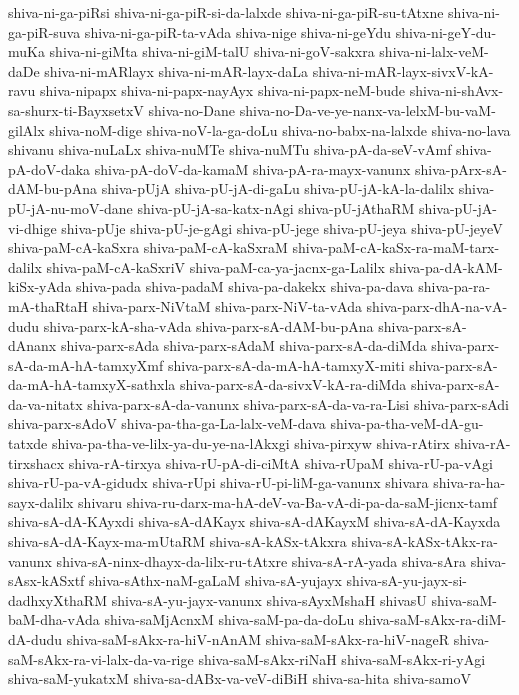 {shiva-ni-ga-piRsi
shiva-ni-ga-piR-si-da-lalxde
shiva-ni-ga-piR-su-tAtxne
shiva-ni-ga-piR-suva
shiva-ni-ga-piR-ta-vAda
shiva-nige
shiva-ni-geYdu
shiva-ni-geY-du-muKa
shiva-ni-giMta
shiva-ni-giM-talU
shiva-ni-goV-sakxra
shiva-ni-lalx-veM-daDe
shiva-ni-mARlayx
shiva-ni-mAR-layx-daLa
shiva-ni-mAR-layx-sivxV-kA-ravu
shiva-nipapx
shiva-ni-papx-nayAyx
shiva-ni-papx-neM-bude
shiva-ni-shAvx-sa-shurx-ti-BayxsetxV
shiva-no-Dane
shiva-no-Da-ve-ye-nanx-va-lelxM-bu-vaM-gilAlx
shiva-noM-dige
shiva-noV-la-ga-doLu
shiva-no-babx-na-lalxde
shiva-no-lava
shivanu
shiva-nuLaLx
shiva-nuMTe
shiva-nuMTu
shiva-pA-da-seV-vAmf
shiva-pA-doV-daka
shiva-pA-doV-da-kamaM
shiva-pA-ra-mayx-vanunx
shiva-pArx-sA-dAM-bu-pAna
shiva-pUjA
shiva-pU-jA-di-gaLu
shiva-pU-jA-kA-la-dalilx
shiva-pU-jA-nu-moV-dane
shiva-pU-jA-sa-katx-nAgi
shiva-pU-jAthaRM
shiva-pU-jA-vi-dhige
shiva-pUje
shiva-pU-je-gAgi
shiva-pU-jege
shiva-pU-jeya
shiva-pU-jeyeV
shiva-paM-cA-kaSxra
shiva-paM-cA-kaSxraM
shiva-paM-cA-kaSx-ra-maM-tarx-dalilx
shiva-paM-cA-kaSxriV
shiva-paM-ca-ya-jacnx-ga-Lalilx
shiva-pa-dA-kAM-kiSx-yAda
shiva-pada
shiva-padaM
shiva-pa-dakekx
shiva-pa-dava
shiva-pa-ra-mA-thaRtaH
shiva-parx-NiVtaM
shiva-parx-NiV-ta-vAda
shiva-parx-dhA-na-vA-dudu
shiva-parx-kA-sha-vAda
shiva-parx-sA-dAM-bu-pAna
shiva-parx-sA-dAnanx
shiva-parx-sAda
shiva-parx-sAdaM
shiva-parx-sA-da-diMda
shiva-parx-sA-da-mA-hA-tamxyXmf
shiva-parx-sA-da-mA-hA-tamxyX-miti
shiva-parx-sA-da-mA-hA-tamxyX-sathxla
shiva-parx-sA-da-sivxV-kA-ra-diMda
shiva-parx-sA-da-va-nitatx
shiva-parx-sA-da-vanunx
shiva-parx-sA-da-va-ra-Lisi
shiva-parx-sAdi
shiva-parx-sAdoV
shiva-pa-tha-ga-La-lalx-veM-dava
shiva-pa-tha-veM-dA-gu-tatxde
shiva-pa-tha-ve-lilx-ya-du-ye-na-lAkxgi
shiva-pirxyw
shiva-rAtirx
shiva-rA-tirxshacx
shiva-rA-tirxya
shiva-rU-pA-di-ciMtA
shiva-rUpaM
shiva-rU-pa-vAgi
shiva-rU-pa-vA-gidudx
shiva-rUpi
shiva-rU-pi-liM-ga-vanunx
shivara
shiva-ra-ha-sayx-dalilx
shivaru
shiva-ru-darx-ma-hA-deV-va-Ba-vA-di-pa-da-saM-jicnx-tamf
shiva-sA-dA-KAyxdi
shiva-sA-dAKayx
shiva-sA-dAKayxM
shiva-sA-dA-Kayxda
shiva-sA-dA-Kayx-ma-mUtaRM
shiva-sA-kASx-tAkxra
shiva-sA-kASx-tAkx-ra-vanunx
shiva-sA-ninx-dhayx-da-lilx-ru-tAtxre
shiva-sA-rA-yada
shiva-sAra
shiva-sAsx-kASxtf
shiva-sAthx-naM-gaLaM
shiva-sA-yujayx
shiva-sA-yu-jayx-si-dadhxyXthaRM
shiva-sA-yu-jayx-vanunx
shiva-sAyxMshaH
shivasU
shiva-saM-baM-dha-vAda
shiva-saMjAcnxM
shiva-saM-pa-da-doLu
shiva-saM-sAkx-ra-diM-dA-dudu
shiva-saM-sAkx-ra-hiV-nAnAM
shiva-saM-sAkx-ra-hiV-nageR
shiva-saM-sAkx-ra-vi-lalx-da-va-rige
shiva-saM-sAkx-riNaH
shiva-saM-sAkx-ri-yAgi
shiva-saM-yukatxM
shiva-sa-dABx-va-veV-diBiH
shiva-sa-hita
shiva-samoV
}
